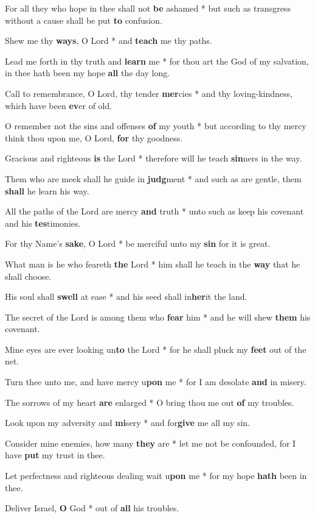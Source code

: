 \begin{multicols}{2}
	For all they who hope in thee shall not \textbf{be} ashamed * but such as transgress without a cause shall be put \textbf{to} confusion.
	
	Shew me thy \textbf{ways}, O Lord * and \textbf{teach} me thy paths.
	
	Lead me forth in thy truth and \textbf{learn} me * for thou art the God of my salvation, in thee hath been my hope \textbf{all} the day long.
	
	Call to remembrance, O Lord, thy tender \textbf{mer}cies * and thy loving-kindness, which have been \textbf{ev}er of old.
	
	O remember not the sins and offenses \textbf{of} my youth * but according to thy mercy think thou upon me, O Lord, \textbf{for} thy goodness.
	
	Gracious and righteous \textbf{is} the Lord * therefore will he teach \textbf{sin}ners in the way.
	
	Them who are meek shall he guide in \textbf{judg}ment * and such as are gentle, them \textbf{shall} he learn his way.
	
	All the paths of the Lord are mercy \textbf{and} truth * unto such as keep his covenant and his \textbf{tes}timonies.
	
	For thy Name's \textbf{sake}, O Lord * be merciful unto my \textbf{sin} for it is great.
	
	What man is he who feareth \textbf{the} Lord * him shall he teach in the \textbf{way} that he shall choose.
	
	His soul shall \textbf{swell} at ease * and his seed shall in\textbf{her}it the land.
	
	The secret of the Lord is among them who \textbf{fear} him * and he will shew \textbf{them} his covenant.
	
	Mine eyes are ever looking un\textbf{to} the Lord * for he shall pluck my \textbf{feet} out of the net.
	
	Turn thee unto me, and have mercy u\textbf{pon} me * for I am desolate \textbf{and} in misery.
	
	The sorrows of my heart \textbf{are} enlarged * O bring thou me out \textbf{of} my troubles.
	
	Look upon my adversity and \textbf{mi}sery * and for\textbf{give} me all my sin.
	
	Consider mine enemies, how many \textbf{they} are * let me not be confounded, for I have \textbf{put} my trust in thee.
	
	Let perfectness and righteous dealing wait u\textbf{pon} me * for my hope \textbf{hath} been in thee.
	
	Deliver Israel, \textbf{O} God * out of \textbf{all} his troubles.
\end{multicols}